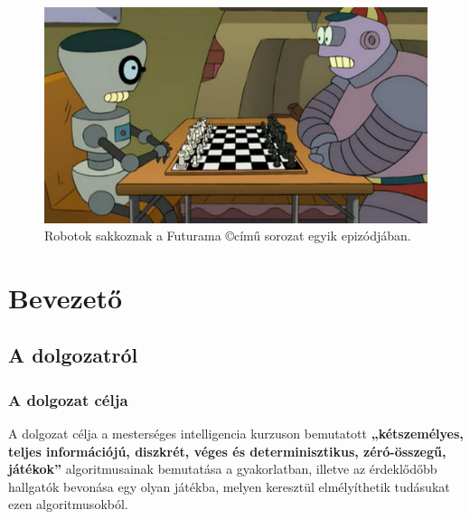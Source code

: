 \documentclass[twoside, a4paper, 12pt]{book}
\title{\THESISTITLE}
\author{\THESISAUTHOR}
\date{\THESISDEFENCEYEAR}
\begin{document}
\raggedbottom
\frontmatter
\pagestyle{empty}


\cleardoublepage

\null
\vspace*{\fill}
\begin{figure}[htbp]
	\centering
	\includegraphics[width=1.0\textwidth]{img/bots_chess.png}
	\caption{Robotok sakkoznak a Futurama \copyright című sorozat egyik epizódjában.}
	\label{fig:bots_chess}
\end{figure}
\vspace*{\fill}
\null
\cleardoublepage
\renewcommand{\contentsname}{Tartalomjegyzék}
\tableofcontents

\pagestyle{plain}
\setcounter{page}{1}




\mainmatter
\newpage
\part{Bevezető}
\chapter{A dolgozatról}
\section{A dolgozat célja}
A dolgozat célja a mesterséges intelligencia kurzuson bemutatott \textbf{„kétszemélyes, teljes információjú, diszkrét, véges és determinisztikus, zéró-összegű, játékok”} algoritmusainak bemutatása a gyakorlatban, illetve az érdeklődőbb hallgatók bevonása egy olyan játékba, melyen keresztül elmélyíthetik tudásukat ezen algoritmusokból.
\end{document}
